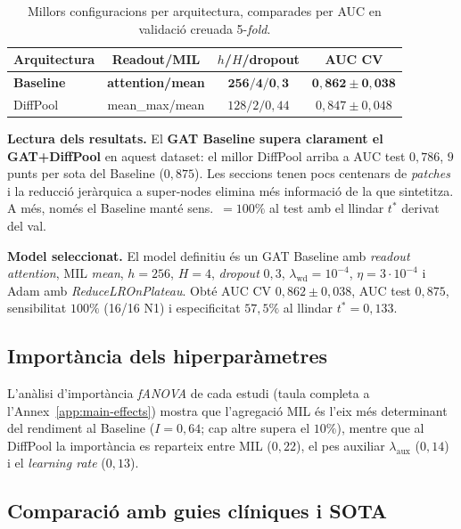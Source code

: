 \documentclass[10pt,a4paper,twocolumn,twoside]{article}
\begin{document}
\begin{table}[t]
\centering
\caption{Millors configuracions per arquitectura, comparades per AUC en validació creuada
5-\textit{fold}.}
\label{tab:configs-compare}
\small
\begin{tabular}{lccc}
\toprule
\textbf{Arquitectura} & \textbf{Readout/MIL}
  & \textbf{$h$/$H$/dropout} & \textbf{AUC CV} \\
\midrule
\textbf{Baseline}  & \textbf{attention/mean}      & $\mathbf{256/4/0{,}3}$ & $\mathbf{0{,}862\!\pm\!0{,}038}$ \\
DiffPool           & mean\_max/mean         & $128/2/0{,}44$         & $0{,}847\!\pm\!0{,}048$ \\
\bottomrule
\end{tabular}
\end{table}

\textbf{Lectura dels resultats.} El \textbf{GAT Baseline supera clarament el GAT+DiffPool}
en aquest dataset: el millor DiffPool arriba a AUC test $0{,}786$, $9$ punts per sota del
Baseline ($0{,}875$). Les seccions tenen pocs centenars de \textit{patches} i
la reducció jeràrquica a super-nodes elimina més informació de la que sintetitza. A més,
només el Baseline manté sens.\ $=100\%$ al test amb el llindar $t^*$ derivat del val.

\textbf{Model seleccionat.} El model definitiu és un GAT Baseline amb \textit{readout}
\textit{attention}, MIL \textit{mean}, $h=256$, $H=4$, \textit{dropout} $0{,}3$,
$\lambda_{\text{wd}}=10^{-4}$, $\eta=3\!\cdot\!10^{-4}$ i Adam amb \textit{ReduceLROnPlateau}.
Obté AUC CV $0{,}862\pm 0{,}038$, AUC test $0{,}875$, sensibilitat $100\%$ (16/16 N1) i
especificitat $57{,}5\%$ al llindar $t^*\!=\!0{,}133$.

\subsection{Importància dels hiperparàmetres}
\label{sec:main-effects}

L'anàlisi d'importància \textit{fANOVA} de cada estudi (taula completa a
l'Annex~\ref{app:main-effects}) mostra que l'agregació MIL és l'eix més
determinant del rendiment al Baseline ($I=0{,}64$; cap altre supera el $10\%$),
mentre que al DiffPool la importància es reparteix entre MIL ($0{,}22$), el pes
auxiliar $\lambda_{\text{aux}}$ ($0{,}14$) i el \textit{learning rate} ($0{,}13$).

\subsection{Comparació amb guies clíniques i SOTA}
\label{sec:resultats-comparacio}
\end{document}
